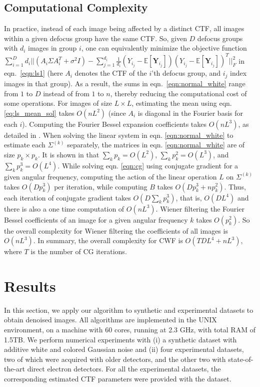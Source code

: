\documentclass[review]{elsarticle}
\begin{document}
\subsection{Computational Complexity}
\label{sec:complexity}
In practice, instead of each image being affected by a distinct CTF, all images 
within a given defocus group have the same CTF. So, given $D$ defocus groups 
with $d_i$
images in group $i$, one can equivalently minimize the objective function
 $\sum_{i=1}^D d_i ||(A_i \Sigma A_i^T + \sigma^2 I) -
 \sum_{j=1}^{d_i} \frac{1}{d_i}(Y_{i_j} - \mathbb{E}[\textbf{Y}_{i_j}]) (Y_{i_j} - 
\mathbb{E}[\textbf{Y}_{i_j}])^T
||_F^2 $ in eqn.\ \ref{eqn:ls1} (here $A_i$ denotes the CTF of the $i$'th defocus group, and $i_j$ index images in that group). 
As a result, the sums in eqn.\ \ref{eqn:normal_white} range 
from $1$ to $D$ instead of from $1$ to $n$, thereby reducing the computational cost 
of some operations.
For images of size $L \times L$, estimating the mean using eqn. 
\ref{eq:ls_mean_sol} takes $O(nL^2)$ (since $A_i$ is diagonal
in the Fourier basis for each $i$). Computing the Fourier Bessel expansion 
coefficients takes $O(nL^3)$, as detailed
in \cite{ffbspca}. When solving the linear system in eqn. \ref{eqn:normal_white}
to estimate each $\Sigma^{(k)}$ separately, the matrices in eqn. 
\ref{eqn:normal_white} are of size $p_k \times p_k$.
It is shown in \cite{ffbspca} that $\sum_k p_k=O(L^2)$, $\sum_k p_k^2=O(L^3)$, 
and $\sum_k p_k^3=O(L^4)$.
While solving eqn. \ref{eqn:cg} using conjugate gradient for a given angular 
frequency, computing the 
action of the linear operation $L$ on $\Sigma^{(k)}$ takes
$O(Dp_k^3)$ per iteration,
while computing $B$ takes $O(Dp_k^3+np_k^2)$. Thus, each iteration of 
conjugate gradient takes
$O(D \sum_k p_k^3)$, that is,
$O(DL^4)$ and there is also a one time computation of $O(nL^3)$.
Wiener filtering the Fourier Bessel coefficients of an image for a given 
angular frequency $k$ takes $O(p_k^2)$. So the overall
complexity for Wiener filtering the coefficients of all images is $O(nL^3)$. 
In summary, the overall complexity for CWF is 
$O(TDL^4 + nL^3)$, where $T$ is the number of CG iterations. 


\section{Results}
\label{sec:results}
In this section, we apply our algorithm to synthetic and experimental datasets 
to obtain denoised images. All algorithms are
implemented in the UNIX environment, on a machine with 60 cores,
running at 2.3 GHz, with total RAM of 1.5TB. We perform numerical experiments 
with
(i) a synthetic dataset with additive white and colored Gaussian noise and (ii) 
four experimental
datasets, two of which were acquired with older detectors, and the other two 
with state-of-the-art
direct electron detectors. For all the experimental datasets, the corresponding
estimated CTF parameters were provided with the dataset.
\end{document}

